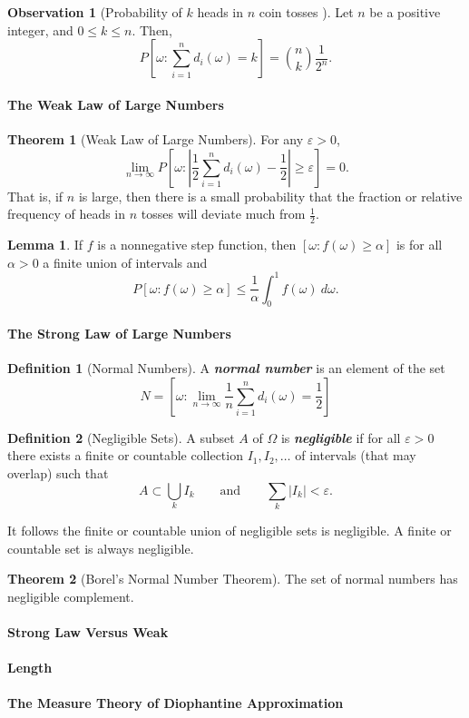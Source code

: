 \documentclass[12pt]{article}
\theoremstyle{definition}
\newtheorem{theorem}{Theorem}
\newtheorem{lemma}{Lemma}
\newtheorem{definition}{Definition}
\newtheorem{observation}{Observation}
\begin{document}
		\begin{observation}[Probability of $k$ heads in $n$ coin tosses ]
			Let $n$ be a positive integer, and $0 \leq k \leq n$. Then, $$P\left[\omega : \sum_{i = 1}^n d_i(\omega) = k\right] = \binom{n}{k} \frac{1}{2^n}.$$
		\end{observation}
	\paragraph{The Weak Law of Large Numbers}
		\begin{theorem}[Weak Law of Large Numbers]
			For any $\varepsilon > 0$, $$\boxed{\lim_{n \to \infty} P \left[\omega : \left|\frac{1}{2} \sum_{i = 1}^n d_i(\omega) - \frac{1}{2}\right| \geq \varepsilon \right]} = 0.$$ That is, if $n$ is large, then there is a small probability that the fraction or relative frequency of heads in $n$ tosses will deviate much from $\frac{1}{2}$. 
		\end{theorem}
		
		\begin{lemma}
			If $f$ is a nonnegative step function, then $[\omega : f(\omega) \geq \alpha]$ is for all $\alpha > 0$ a finite union of intervals and $$P[\omega : f(\omega) \geq \alpha] \leq \frac{1}{\alpha} \int_0^1 f(\omega) \ d \omega.$$
		\end{lemma} 
	\paragraph{The Strong Law of Large Numbers}
		\begin{definition}[Normal Numbers]
			A \textbf{\textit{normal number}} is an element of the set $$N = \left[\omega : \lim_{n \to \infty} \frac{1}{n} \sum_{i = 1}^n d_i(\omega) = \frac{1}{2}\right]$$
		\end{definition}
		\begin{definition}[Negligible Sets]
			A subset $A$ of $\Omega$ is \textbf{\textit{negligible}} if for all $\varepsilon > 0$ there exists a finite or countable collection $I_1, I_2, \dots$ of intervals (that may overlap) such that $$A \subset \bigcup_k I_k \qquad \text{and} \qquad \sum_k |I_k| < \varepsilon.$$
		\end{definition}
		
		It follows the finite or countable union of negligible sets is negligible. A finite or countable set is always negligible. 
		
		\begin{theorem}[Borel's Normal Number Theorem]
			The set of normal numbers has negligible complement. 
		\end{theorem}
	\paragraph{Strong Law Versus Weak}
	
	\paragraph{Length}
	
	\paragraph{The Measure Theory of Diophantine Approximation}
\end{document}
